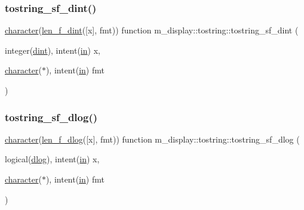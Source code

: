 \mbox{\label{interfacem__display_1_1tostring_a6fcaa07d4fdb0f6ee09a3e93bb380bd5}} 
\subsubsection{\texorpdfstring{tostring\+\_\+sf\+\_\+dint()}{tostring\_sf\_dint()}}
{\footnotesize\ttfamily \hyperlink{option__stopwatch_83_8txt_abd4b21fbbd175834027b5224bfe97e66}{character}(\hyperlink{namespacem__display_a6a2709cf5f243ee492f223b40c6b5143}{len\+\_\+f\+\_\+dint}(\mbox{[}x\mbox{]}, fmt)) function m\+\_\+display\+::tostring\+::tostring\+\_\+sf\+\_\+dint (\begin{DoxyParamCaption}\item[{integer(\hyperlink{namespacem__display_a73f772e9702cad6f40b78364fde2c7cd}{dint}), intent(\hyperlink{M__journal_83_8txt_afce72651d1eed785a2132bee863b2f38}{in})}]{x,  }\item[{\hyperlink{option__stopwatch_83_8txt_abd4b21fbbd175834027b5224bfe97e66}{character}($\ast$), intent(\hyperlink{M__journal_83_8txt_afce72651d1eed785a2132bee863b2f38}{in})}]{fmt }\end{DoxyParamCaption})\hspace{0.3cm}{\ttfamily [private]}}

\mbox{\label{interfacem__display_1_1tostring_af94b7a40c83ff3f63fd8c3b3c034bc70}} 
\subsubsection{\texorpdfstring{tostring\+\_\+sf\+\_\+dlog()}{tostring\_sf\_dlog()}}
{\footnotesize\ttfamily \hyperlink{option__stopwatch_83_8txt_abd4b21fbbd175834027b5224bfe97e66}{character}(\hyperlink{namespacem__display_a2a298a8f2faf00047152b93cd265d396}{len\+\_\+f\+\_\+dlog}(\mbox{[}x\mbox{]}, fmt)) function m\+\_\+display\+::tostring\+::tostring\+\_\+sf\+\_\+dlog (\begin{DoxyParamCaption}\item[{logical(\hyperlink{namespacem__display_a8c6a3df510feabf6bc84dd0a8789f98c}{dlog}), intent(\hyperlink{M__journal_83_8txt_afce72651d1eed785a2132bee863b2f38}{in})}]{x,  }\item[{\hyperlink{option__stopwatch_83_8txt_abd4b21fbbd175834027b5224bfe97e66}{character}($\ast$), intent(\hyperlink{M__journal_83_8txt_afce72651d1eed785a2132bee863b2f38}{in})}]{fmt }\end{DoxyParamCaption})\hspace{0.3cm}{\ttfamily [private]}}

